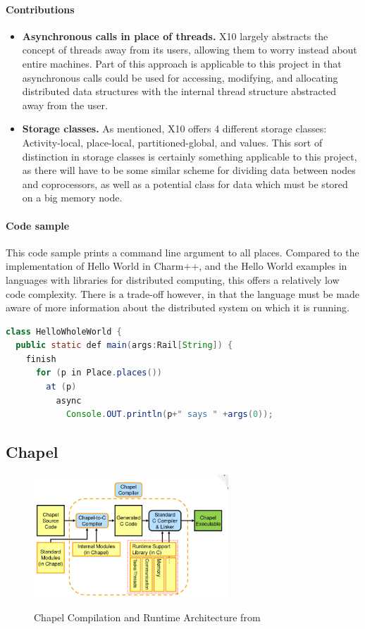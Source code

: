{\paragraph{Contributions}
\begin{itemize}
	\item \textbf{Asynchronous calls in place of threads.} X10 largely abstracts the concept of threads away from its users, allowing them to worry instead about entire machines. Part of this approach is applicable to this project in that asynchronous calls could be used for accessing, modifying, and allocating distributed data structures with the internal thread structure abstracted away from the user. 

	\item \textbf{Storage classes.} As mentioned, X10 offers 4 different storage classes: Activity-local, place-local, partitioned-global, and values. This sort of distinction in storage classes is certainly something applicable to this project, as there will have to be some similar scheme for dividing data between nodes and coprocessors, as well as a potential class for data which must be stored on a big memory node. 

\end{itemize}

\paragraph{Code sample}
This code sample prints a command line argument to all places. Compared to the implementation of Hello World in Charm++, and the Hello World examples in languages with libraries for distributed computing, this offers a relatively low code complexity. There is a trade-off however, in that the language must be made aware of more information about the distributed system on which it is running. 
\begin{lstlisting}[language=Java, caption=Hello World in X10 from \cite{X10_site}]
class HelloWholeWorld {
  public static def main(args:Rail[String]) {
    finish
	  for (p in Place.places())
	    at (p)
		  async
		    Console.OUT.println(p+" says " +args(0));
\end{lstlisting}


\subsection{Chapel}
    \begin{figure}[h]
		\centering
		\includegraphics[width=0.65\textwidth]{Figures/chapel_arch.png}
        \label{fig:chapel_arch}
		\caption{Chapel Compilation and Runtime Architecture from \cite{chapel_rts_ppt}}
    \end{figure}
}
